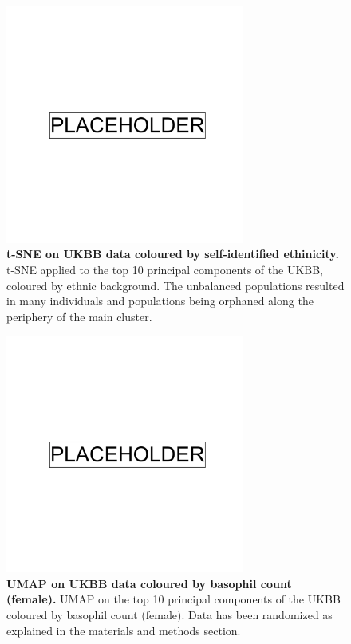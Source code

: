 \begin{figure}[!htb]
    \centering
    \includegraphics[width=0.7\textwidth]{placeholder.png}
    \caption[t-SNE on UKBB data coloured by self-identified ethinicity]{\textbf{t-SNE on UKBB data coloured by self-identified ethinicity.} t-SNE applied to the top 10 principal components of the UKBB, coloured by ethnic background. The unbalanced populations resulted in many individuals and populations being orphaned along the periphery of the main cluster.}
    \label{fig:supp_ukbb_tsne}
\end{figure}

\begin{figure}
    \centering
    \includegraphics[width=0.7\textwidth]{placeholder.png}
    \caption[UMAP on UKBB data coloured by basophil count (female)]{\textbf{UMAP on UKBB data coloured by basophil count (female).} UMAP on the top 10 principal components of the UKBB coloured by basophil count (female). Data has been randomized as explained in the materials and methods section.}
    \label{fig:supp_ukbb_basophill_f}
\end{figure}

